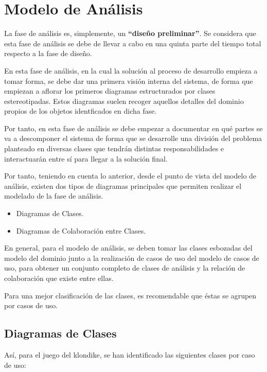 \documentclass[11pt]{article}
\begin{document}
\pagebreak

\section{Modelo de Análisis}

La fase de análisis es, simplemente, un \textbf{``diseño preliminar''}. Se considera que esta fase de análisis se debe de llevar a cabo en una quinta parte del tiempo total respecto a la fase de diseño.

En esta fase de análisis, en la cual la solución al proceso de desarrollo empieza a tomar forma, se debe dar una primera visión interna del sistema, de forma que empiezan a aflorar los primeros diagramas estructurados por clases estereotipadas. Estos diagramas suelen recoger aquellos detalles del dominio propios de los objetos identficados en dicha fase.

Por tanto, en esta fase de análisis se debe empezar a documentar en qué partes se va a descomponer el sistema de forma que se desarrolle una división del problema planteado en diversas clases que tendrán distintas responsabilidades e interactuarán entre sí para llegar a la solución final. 

Por tanto, teniendo en cuenta lo anterior, desde el punto de vista del modelo de análisis, existen dos tipos de diagramas principales que permiten realizar el modelado de la fase de análisis.

\begin{itemize}
\item{Diagramas de Clases}. 
\item{Diagramas de Colaboración entre Clases}.
\end{itemize}

En general, para el modelo de análisis, se deben tomar las clases esbozadas del modelo del dominio junto a la realización de casos de uso del modelo de casos de uso, para obtener un conjunto completo de clases de análisis y la relación de colaboración que existe entre ellas.

Para una mejor clasificación de las clases, es recomendable que éstas se agrupen por casos de uso.

\subsection{Diagramas de Clases}

Así, para el juego del klondike, se han identificado las siguientes clases por caso de uso:
\end{document}
